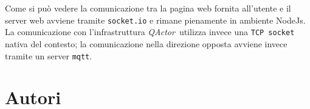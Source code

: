 \documentclass{llncs}
\newcommand{\action}[1]{\texttt{#1}\xspace}
\newcommand{\node}{\textsf{NodeJs}}
\newcommand{\qa}{\textsf{\textit{QActor}}}
\newcommand{\labelsec}[1]{\label{sec:#1}}
\begin{document}
Come si può vedere la comunicazione tra la pagina web fornita all'utente e il server web avviene tramite \action{socket.io} e rimane pienamente in ambiente \node. La comunicazione con l'infrastruttura \qa\ utilizza invece una \action{TCP socket} nativa del contesto; la comunicazione nella direzione opposta avviene invece tramite un server \action{mqtt}.

%
%
%
\newpage
\section{Autori}
\labelsec{Authors}
\end{document}
